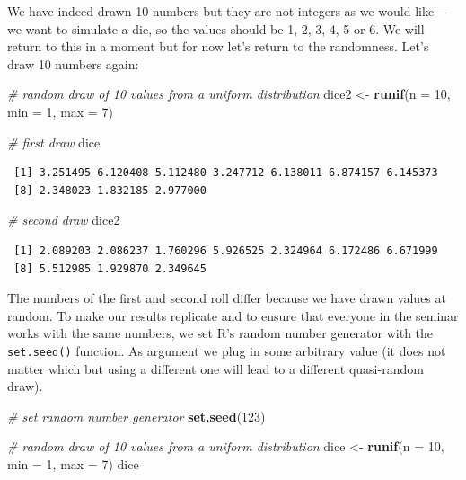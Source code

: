 \documentclass[]{article}
\newenvironment{Shaded}{\begin{snugshade}}{\end{snugshade}}
\newcommand{\KeywordTok}[1]{\textcolor[rgb]{0.13,0.29,0.53}{\textbf{#1}}}
\newcommand{\DataTypeTok}[1]{\textcolor[rgb]{0.13,0.29,0.53}{#1}}
\newcommand{\DecValTok}[1]{\textcolor[rgb]{0.00,0.00,0.81}{#1}}
\newcommand{\StringTok}[1]{\textcolor[rgb]{0.31,0.60,0.02}{#1}}
\newcommand{\CommentTok}[1]{\textcolor[rgb]{0.56,0.35,0.01}{\textit{#1}}}
\newcommand{\NormalTok}[1]{#1}
\theoremstyle{definition}
\theoremstyle{definition}
\theoremstyle{definition}
\theoremstyle{remark}
\begin{document}
We have indeed drawn 10 numbers but they are not integers as we would
like---we want to simulate a die, so the values should be 1, 2, 3, 4, 5
or 6. We will return to this in a moment but for now let's return to the
randomness. Let's draw 10 numbers again:

\begin{Shaded}
\begin{Highlighting}[]
\CommentTok{# random draw of 10 values from a uniform distribution}
\NormalTok{dice2 <-}\StringTok{ }\KeywordTok{runif}\NormalTok{(}\DataTypeTok{n =} \DecValTok{10}\NormalTok{, }\DataTypeTok{min =} \DecValTok{1}\NormalTok{, }\DataTypeTok{max =} \DecValTok{7}\NormalTok{)}

\CommentTok{# first draw}
\NormalTok{dice}
\end{Highlighting}
\end{Shaded}

\begin{verbatim}
 [1] 3.251495 6.120408 5.112480 3.247712 6.138011 6.874157 6.145373
 [8] 2.348023 1.832185 2.977000
\end{verbatim}

\begin{Shaded}
\begin{Highlighting}[]
\CommentTok{# second draw}
\NormalTok{dice2}
\end{Highlighting}
\end{Shaded}

\begin{verbatim}
 [1] 2.089203 2.086237 1.760296 5.926525 2.324964 6.172486 6.671999
 [8] 5.512985 1.929870 2.349645
\end{verbatim}

The numbers of the first and second roll differ because we have drawn
values at random. To make our results replicate and to ensure that
everyone in the seminar works with the same numbers, we set R's random
number generator with the \texttt{set.seed()} function. As argument we
plug in some arbitrary value (it does not matter which but using a
different one will lead to a different quasi-random draw).

\begin{Shaded}
\begin{Highlighting}[]
\CommentTok{# set random number generator}
\KeywordTok{set.seed}\NormalTok{(}\DecValTok{123}\NormalTok{)}

\CommentTok{# random draw of 10 values from a uniform distribution}
\NormalTok{dice <-}\StringTok{ }\KeywordTok{runif}\NormalTok{(}\DataTypeTok{n =} \DecValTok{10}\NormalTok{, }\DataTypeTok{min =} \DecValTok{1}\NormalTok{, }\DataTypeTok{max =} \DecValTok{7}\NormalTok{)}
\NormalTok{dice}
\end{Highlighting}
\end{Shaded}
\end{document}
